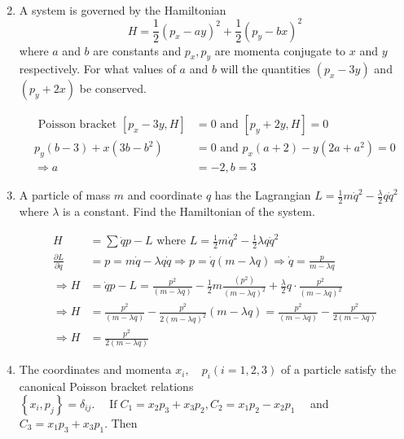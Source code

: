 \begin{enumerate}
\begin{answer}
\begin{align*}
	\end{align*}
\end{answer}
\item A system is governed by the Hamiltonian
$$
H=\frac{1}{2}\left(p_{x}-a y\right)^{2}+\frac{1}{2}\left(p_{y}-b x\right)^{2}
$$
where $a$ and $b$ are constants and $p_{x}, p_{y}$ are momenta conjugate to $x$ and $y$ respectively. For what values of $a$ and $b$ will the quantities $\left(p_{x}-3 y\right)$ and $\left(p_{y}+2 x\right)$ be conserved.
\begin{answer}
	\begin{align*}
	\text { Poisson bracket }\left[p_{x}-3 y, H\right]&=0 \text { and }\left[p_{y}+2 y, H\right]=0\\
	p_{y}(b-3)+x\left(3 b-b^{2}\right)&=0 \text { and } p_{x}(a+2)-y\left(2 a+a^{2}\right)=0\\
	\Rightarrow a&=-2, b=3
	\end{align*}
\end{answer}
\item A particle of mass $m$ and coordinate $q$ has the Lagrangian $L=\frac{1}{2} m \dot{q}^{2}-\frac{\lambda}{2} q \dot{q}^{2}$ where $\lambda$ is a constant. Find the Hamiltonian of the system.
\begin{answer}
	\begin{align*}
	H&=\sum \dot{q} p-L \text { where } L=\frac{1}{2} m \dot{q}^{2}-\frac{1}{2} \lambda q \dot{q}^{2}\\
	\frac{\partial L}{\partial \dot{q}}&=p=m \dot{q}-\lambda q \dot{q} \Rightarrow p=\dot{q}(m-\lambda q) \Rightarrow \dot{q}=\frac{p}{m-\lambda q}\\
	\Rightarrow H&=\dot{q} p-L=\frac{p^{2}}{(m-\lambda q)}-\frac{1}{2} m \frac{\left(p^{2}\right)}{(m-\lambda q)^{2}}+\frac{\lambda}{2} q \cdot \frac{p^{2}}{(m-\lambda q)^{2}}\\
	\Rightarrow H&=\frac{p^{2}}{(m-\lambda q)}-\frac{p^{2}}{2(m-\lambda q)^{2}}(m-\lambda q)=\frac{p^{2}}{(m-\lambda q)}-\frac{p^{2}}{2(m-\lambda q)}\\
	\Rightarrow H&=\frac{p^{2}}{2(m-\lambda q)}
	\end{align*}
\end{answer}
\item The coordinates and momenta $x_{i}, \quad p_{i}(i=1,2,3)$ of a particle satisfy the canonical Poisson bracket relations $\left\{x_{i}, p_{j}\right\}=\delta_{i j} . \quad \operatorname{If} C_{1}=x_{2} p_{3}+x_{3} p_{2}, C_{2}=x_{1} p_{2}-x_{2} p_{1} \quad$ and $C_{3}=x_{1} p_{3}+x_{3} p_{1} .$ Then\\

\end{enumerate}
